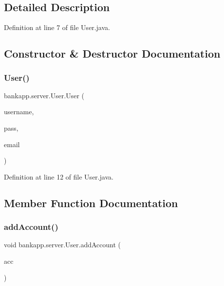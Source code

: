 \subsection{Detailed Description}


Definition at line 7 of file User.\+java.



\subsection{Constructor \& Destructor Documentation}
\mbox{\label{classbankapp_1_1server_1_1_user_ae5d0c0c37ed136f1c3e7534a4af49105}} 
\subsubsection{\texorpdfstring{User()}{User()}}
{\footnotesize\ttfamily bankapp.\+server.\+User.\+User (\begin{DoxyParamCaption}\item[{String}]{username,  }\item[{String}]{pass,  }\item[{String}]{email }\end{DoxyParamCaption})}



Definition at line 12 of file User.\+java.



\subsection{Member Function Documentation}
\mbox{\label{classbankapp_1_1server_1_1_user_adcf98c41bd09b94a9a068c9bb2fa1f5e}} 
\subsubsection{\texorpdfstring{add\+Account()}{addAccount()}}
{\footnotesize\ttfamily void bankapp.\+server.\+User.\+add\+Account (\begin{DoxyParamCaption}\item[{\hyperlink{classbankapp_1_1server_1_1bank_account}{bank\+Account}}]{acc }\end{DoxyParamCaption})}



